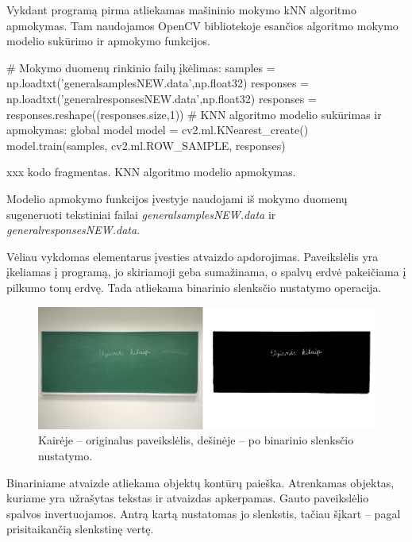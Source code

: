 \documentclass[a4paper,12pt]{article}
\begin{document}
 Vykdant programą pirma atliekamas mašininio mokymo kNN algoritmo apmokymas. Tam naudojamos OpenCV bibliotekoje esančios algoritmo mokymo modelio sukūrimo ir apmokymo funkcijos.
 \begin{listing}[H]
 	\begin{pythoncode}
# Mokymo duomenų rinkinio failų įkėlimas:
samples = np.loadtxt('generalsamplesNEW.data',np.float32)
responses = np.loadtxt('generalresponsesNEW.data',np.float32)
responses = responses.reshape((responses.size,1))
# KNN algoritmo modelio sukūrimas ir apmokymas:
global model
model = cv2.ml.KNearest_create()
model.train(samples, cv2.ml.ROW_SAMPLE, responses)
 	\end{pythoncode}
 	\begin{center}
 		xxx kodo fragmentas. KNN algoritmo modelio apmokymas.
 	\end{center}		
 \end{listing}
 
Modelio apmokymo funkcijos įvestyje naudojami iš mokymo duomenų sugeneruoti tekstiniai failai \textit{generalsamplesNEW.data} ir \textit{generalresponsesNEW.data}.

Vėliau vykdomas elementarus įvesties atvaizdo apdorojimas. Paveikslėlis yra įkeliamas į programą, jo skiriamoji geba sumažinama, o spalvų erdvė pakeičiama į pilkumo tonų erdvę. Tada atliekama binarinio slenksčio nustatymo operacija.
		\begin{figure}[H]
			\centering
			\includegraphics[scale=0.4]{images/binarythresh}
			\caption{Kairėje – originalus paveikslėlis, dešinėje – po binarinio slenksčio nustatymo.}   %
			\label{img:binarythresh}
		\end{figure}

Binariniame atvaizde atliekama objektų kontūrų paieška. Atrenkamas objektas, kuriame yra užrašytas tekstas ir atvaizdas apkerpamas. Gauto paveikslėlio spalvos invertuojamos. Antrą kartą nustatomas jo slenkstis, tačiau šįkart – pagal prisitaikančią slenkstinę vertę. 
\end{document}
